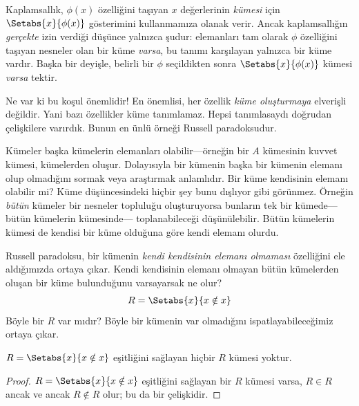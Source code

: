 \documentclass[../../../include/open-logic-section]{subfiles}
\begin{document}

Kaplamsallık, $\phi(x)$ özelliğini taşıyan $x$ değerlerinin \emph{kümesi} için
$\Setabs{x}{\phi(x)}$ gösterimini kullanmamıza olanak verir. Ancak
kaplamsallığın \emph{gerçekte} izin verdiği düşünce yalnızca şudur:
elemanları tam olarak $\phi$ özelliğini taşıyan nesneler olan bir küme
\emph{varsa}, bu tanımı karşılayan yalnızca bir küme vardır. Başka bir deyişle,
belirli bir $\phi$ seçildikten sonra $\Setabs{x}{\phi(x)}$ kümesi \emph{varsa}
tektir.

Ne var ki bu koşul önemlidir!{} En önemlisi, her özellik \emph{küme
oluşturmaya} elverişli değildir. Yani bazı özellikler küme tanımlamaz. Hepsi
tanımlasaydı doğrudan çelişkilere varırdık. Bunun en ünlü örneği Russell
paradoksudur.

Kümeler başka kümelerin elemanları olabilir---örneğin bir $A$ kümesinin
kuvvet kümesi, kümelerden oluşur. Dolayısıyla bir kümenin başka bir kümenin
elemanı olup olmadığını sormak veya araştırmak anlamlıdır. Bir küme kendisinin
elemanı olabilir mi? Küme düşüncesindeki hiçbir şey bunu
dışlıyor gibi görünmez. Örneğin \emph{bütün} kümeler bir nesneler topluluğu
oluşturuyorsa bunların tek bir kümede---bütün kümelerin kümesinde---
toplanabileceği düşünülebilir. Bütün kümelerin kümesi de kendisi bir küme
olduğuna göre kendi elemanı olurdu.

Russell paradoksu, bir kümenin \emph{kendi kendisinin elemanı olmaması}
özelliğini ele aldığımızda ortaya çıkar. Kendi kendisinin elemanı olmayan bütün kümelerden
oluşan bir küme
bulunduğunu varsayarsak ne olur?
\[
R = \Setabs{x}{x \notin x}
\]
Böyle bir $R$ var mıdır? Böyle bir kümenin var olmadığını
ispatlayabileceğimiz ortaya çıkar.

\begin{thm}
	$R = \Setabs{x}{x \notin x}$ eşitliğini sağlayan hiçbir $R$ kümesi yoktur.
\end{thm}

\begin{proof}
$R = \Setabs{x}{x \notin x}$ eşitliğini sağlayan bir $R$ kümesi varsa,
$R \in R$ ancak ve ancak $R \notin R$ olur; bu da bir çelişkidir.
\end{proof}
\end{document}
